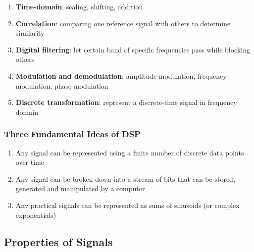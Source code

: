       \begin{enumerate}
        \item \textbf{Time-domain}: scaling, shifting, addition
        \item \textbf{Correlation}: comparing one reference signal with others
        to determine similarity
        \item \textbf{Digital filtering}: let certain band of specific frequencies
        pass while blocking others
        \item \textbf{Modulation and demodulation}: amplitude modulation,
        frequency modulation, phase modulation
        \item \textbf{Discrete transformation}: represent a discrete-time signal
        in frequency domain
      \end{enumerate}

    \subsubsection{Three Fundamental Ideas of DSP}

      \begin{enumerate}
        \item Any signal can be represented using a finite number of discrete
        data points over time
        \item Any signal can be broken down into a stream of bits that can
        be stored, generated and manipulated by a computer
        \item Any practical signals can be represented as sums of sinusoids
        (or complex exponentials)
      \end{enumerate}

  \subsection{Properties of Signals}

